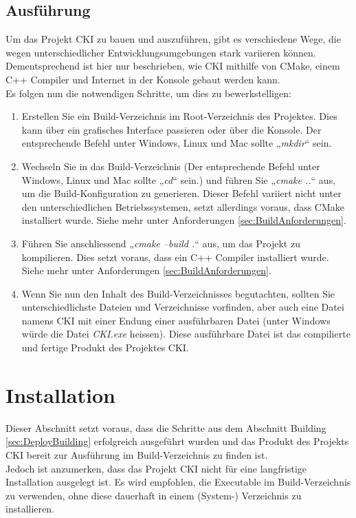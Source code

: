 \subsection{Ausführung}
\label{sec:BuildAusführung}
Um das Projekt CKI zu bauen und auszuführen, gibt es verschiedene Wege, die wegen unterschiedlicher Entwicklungsumgebungen stark variieren können. Dementsprechend ist hier nur beschrieben, wie CKI mithilfe von CMake, einem C++ Compiler und Internet in der Konsole gebaut werden kann.
\\
Es folgen nun die notwendigen Schritte, um dies zu bewerkstelligen:
\begin{enumerate}
	\item Erstellen Sie ein Build-Verzeichnis im Root-Verzeichnis des Projektes. Dies kann über ein grafisches Interface passieren oder über die Konsole. Der entsprechende Befehl unter Windows, Linux und Mac sollte „\textit{mkdir}“ sein.
	\item Wechseln Sie in das Build-Verzeichnis (Der entsprechende Befehl unter Windows, Linux und Mac sollte „\textit{cd}“ sein.) und führen Sie „\textit{cmake ..}“ aus, um die Build-Konfiguration zu generieren. Dieser Befehl variiert nicht unter den unterschiedlichen Betriebssystemen, setzt allerdings voraus, dass CMake installiert wurde. Siehe mehr unter Anforderungen \ref{sec:BuildAnforderungen}.
	\item Führen Sie anschliessend „\textit{cmake --build .}“ aus, um das Projekt zu kompilieren. Dies setzt voraus, dass ein C++ Compiler installiert wurde. Siehe mehr unter Anforderungen \ref{sec:BuildAnforderungen}.
	\item Wenn Sie nun den Inhalt des Build-Verzeichnisses begutachten, sollten Sie unterschiedlichste Dateien und Verzeichnisse vorfinden, aber auch eine Datei namens CKI mit einer Endung einer ausführbaren Datei (unter Windows würde die Datei \textit{CKI.exe} heissen). Diese ausführbare Datei ist das compilierte und fertige Produkt des Projektes CKI.
\end{enumerate}

\section{Installation}
Dieser Abschnitt setzt voraus, dass die Schritte aus dem Abschnitt Building \ref{sec:DeployBuilding} erfolgreich ausgeführt wurden und das Produkt des Projekts CKI bereit zur Ausführung im Build-Verzeichnis zu finden ist.
\\
Jedoch ist anzumerken, dass das Projekt CKI nicht für eine langfristige Installation ausgelegt ist. Es wird empfohlen, die Executable im Build-Verzeichnis zu verwenden, ohne diese dauerhaft in einem (System-) Verzeichnis zu installieren.

